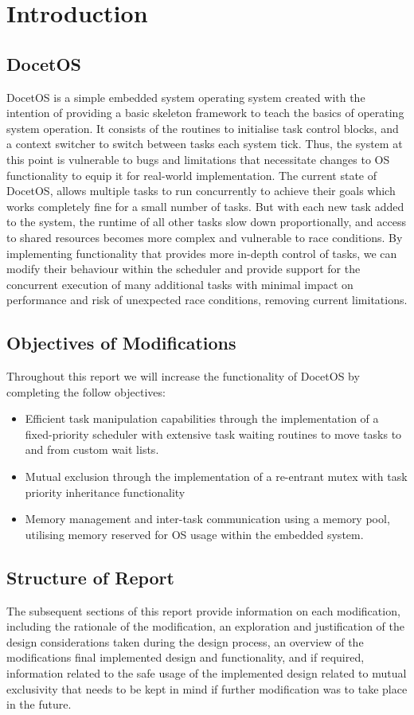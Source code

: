 \section{Introduction}
\subsection{DocetOS}
DocetOS is a simple embedded system operating system created with the intention of providing a basic skeleton framework to teach the basics of operating system operation. It consists of the routines to initialise task control blocks, and a context switcher to switch between tasks each system tick. Thus, the system at this point is vulnerable to bugs and limitations that necessitate changes to OS functionality to equip it for real-world implementation.\hfill\newline
The current state of DocetOS, allows multiple tasks to run concurrently to achieve their goals which works completely fine for a small number of tasks. But with each new task added to the system, the runtime of all other tasks slow down proportionally, and access to shared resources becomes more complex and vulnerable to race conditions. By implementing functionality that provides more in-depth control of tasks, we can modify their behaviour within the scheduler and provide support for the concurrent execution of many additional tasks with minimal impact on performance and risk of unexpected race conditions, removing current limitations.

\subsection{Objectives of Modifications}
Throughout this report we will increase the functionality of DocetOS by completing the follow objectives:
\begin{itemize}
	\item	Efficient task manipulation capabilities through the implementation of a fixed-priority scheduler with extensive task waiting routines to move tasks to and from custom wait lists.
	\item	Mutual exclusion through the implementation of a re-entrant mutex with task priority inheritance functionality
	\item	Memory management and inter-task communication using a memory pool, utilising memory reserved for OS usage within the embedded system.

\end{itemize}

\subsection{Structure of Report}
The subsequent sections of this report provide information on each modification, including the rationale of the modification, an exploration and justification of the design considerations taken during the design process, an overview of the modifications final implemented design and functionality, and if required, information related to the safe usage of the implemented design related to mutual exclusivity that needs to be kept in mind if further modification was to take place in the future.